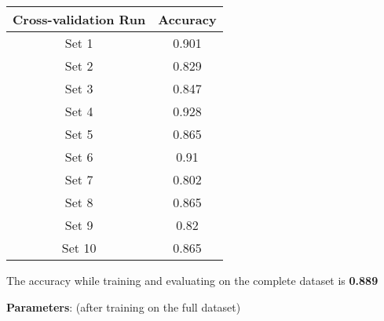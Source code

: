 \documentclass[a4paper]{article}
\begin{document}
\begin{center} 
	\begin{tabular}{ |c|c| } 
		\hline
		\textbf{Cross-validation Run} & \textbf{Accuracy} \\
		\hline
		\hline
		Set 1 & 0.901 \\
		\hline
		Set 2 & 0.829 \\
		\hline
		Set 3 & 0.847 \\
		\hline
		Set 4 & 0.928 \\
		\hline
		Set 5 & 0.865 \\
		\hline
		Set 6 & 0.91 \\
		\hline
		Set 7 & 0.802 \\
		\hline
		Set 8 & 0.865 \\
		\hline
		Set 9 & 0.82 \\
		\hline
		Set 10 & 0.865 \\
		\hline
	\end{tabular}
\end{center}

The accuracy while training and evaluating on the complete dataset is \textbf{0.889}

\vspace{5mm}

\textbf{Parameters}: (after training on the full dataset)

\vspace{5mm}
\end{document}
